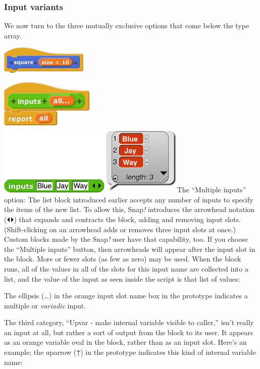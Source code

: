 \subsubsection*{Input variants}\label{input-variants}

We now turn to the three mutually exclusive options that come below the
type array.

\includegraphics[width=1.63889in,height=0.52083in]{media/image678.png}

\includegraphics[width=1.76389in,height=0.93056in]{media/image679.png}\includegraphics[width=3.56944in,height=1.29444in]{media/image680.png}The
``Multiple inputs'' option: The list block introduced earlier accepts
any number of inputs to specify the items of the new list. To allow
this, Snap\emph{!} introduces the arrowhead notation (⏴⏵) that expands
and contracts the block, adding and removing input slots.
(Shift-clicking on an arrowhead adds or removes three input slots at
once.) Custom blocks made by the Snap\emph{!} user have that capability,
too. If you choose the ``Multiple inputs'' button, then arrowheads will
appear after the input slot in the block. More or fewer slots (as few as
zero) may be used. When the block runs, all of the values in all of the
slots for this input name are collected into a list, and the value of
the input as seen inside the script is that list of values:

The ellipsis (\ldots) in the orange input slot name box in the prototype
indicates a multiple or \emph{variadic} input.

The third category, ``Upvar - make internal variable visible to
caller,'' isn't really an input at all, but rather a sort of output from
the block to its user. It appears as an orange variable oval in the
block, rather than as an input slot. Here's an example; the uparrow
(\textbf{↑}) in the prototype indicates this kind of internal variable
name:

